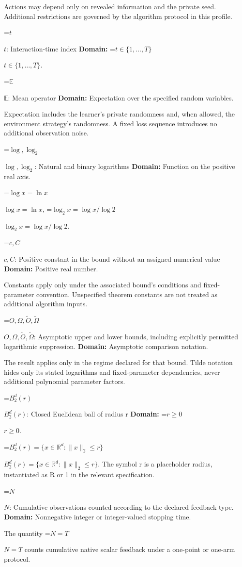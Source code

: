 \documentclass[10pt,a4paper]{article}
\newcommand{\AtlasMath}[1]{\par\begingroup\centering\setbox0=\hbox{$\displaystyle #1$}\ifdim\wd0>1.4\linewidth\typeout{ATLAS WIDE FORMULA: \the\wd0}\fi\ifdim\wd0>\linewidth\resizebox{\linewidth}{!}{\box0}\else\box0\fi\par\endgroup}
\newcommand{\AtlasInlineMath}[1]{\begingroup\setbox0=\hbox{$#1$}\ifdim\wd0>.4\linewidth\endgroup\AtlasMath{#1}\else\endgroup$#1$\fi}
\begin{document}
Actions may depend only on revealed information and the private seed. Additional restrictions are governed by the algorithm protocol in this profile.

\AtlasInlineMath{t}: Interaction-time index \textbf{Domain:} \AtlasInlineMath{t\in\{1,\ldots,T\}}.

\AtlasInlineMath{\mathbb E}: Mean operator \textbf{Domain:} Expectation over the specified random variables.

Expectation includes the learner's private randomness and, when allowed, the environment strategy's randomness. A fixed loss sequence introduces no additional observation noise.

\AtlasInlineMath{\log,\log_2}: Natural and binary logarithms \textbf{Domain:} Function on the positive real axis.

\AtlasInlineMath{\log x=\ln x}, \AtlasInlineMath{\log_2x=\log x/\log2}.

\AtlasInlineMath{c,C}: Positive constant in the bound without an assigned numerical value \textbf{Domain:} Positive real number.

Constants apply only under the associated bound’s conditions and fixed-parameter convention. Unspecified theorem constants are not treated as additional algorithm inputs.

\AtlasInlineMath{O,\Omega,\widetilde O,\widetilde\Omega}: Asymptotic upper and lower bounds, including explicitly permitted logarithmic suppression. \textbf{Domain:} Asymptotic comparison notation.

The result applies only in the regime declared for that bound. Tilde notation hides only its stated logarithms and fixed-parameter dependencies, never additional polynomial parameter factors.

\AtlasInlineMath{B_2^d(r)}: Closed Euclidean ball of radius r \textbf{Domain:} \AtlasInlineMath{r\ge0}.

\AtlasInlineMath{B_2^d(r)=\{x\in\mathbb R^d:\|x\|_2\le r\}}. The symbol r is a placeholder radius, instantiated as R or 1 in the relevant specification.

\AtlasInlineMath{N}: Cumulative observations counted according to the declared feedback type. \textbf{Domain:} Nonnegative integer or integer-valued stopping time.

The quantity \AtlasInlineMath{N=T} counts cumulative native scalar feedback under a one-point or one-arm protocol.
\end{document}
